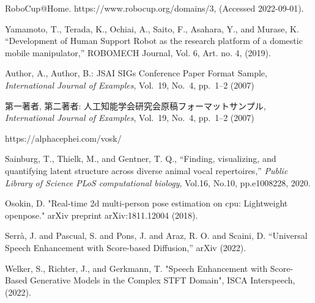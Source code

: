 \documentclass[a4j]{jarticle}
\begin{document}
\begin{thebibliography}{99}

RoboCup@Home. https://www.robocup.org/domains/3, (Accessed 2022-09-01).

Yamamoto, T., Terada, K., Ochiai, A., Saito, F., Asahara, Y., and Murase, K. “Development of Human Support Robot as the research platform of a domestic mobile manipulator,” ROBOMECH Journal, Vol. 6, Art. no. 4, (2019).

Author, A., Author, B.:
JSAI SIGs Conference Paper Format Sample,
{\it International Journal of Examples}, Vol.~19, No.~4, pp.~1--2 (2007)

第一著者, 第二著者:
人工知能学会研究会原稿フォーマットサンプル,
{\it International Journal of Examples}, Vol.~19, No.~4, pp.~1--2 (2007)

https://alphacephei.com/vosk/


Sainburg, T., Thielk, M., and Gentner, T. Q.,
“Finding, visualizing, and quantifying latent structure across diverse animal vocal repertoires,”
{\it Public Library of Science PLoS computational biology},
Vol.16,
No.10,
pp.e1008228,
2020.

Osokin, D. "Real-time 2d multi-person pose estimation on cpu: Lightweight openpose." arXiv preprint arXiv:1811.12004 (2018).

Serrà, J. and Pascual, S. and Pons, J. and Araz, R. O. and Scaini, D. “Universal Speech Enhancement with Score-based Diffusion,” arXiv (2022).

Welker, S., Richter, J., and Gerkmann, T. "Speech Enhancement with Score-Based Generative Models in the Complex STFT Domain", ISCA Interspeech, (2022).

\end{thebibliography}
\end{document}

